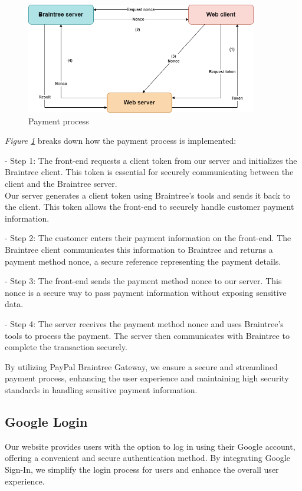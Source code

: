 \begin{figure}[H]
    \centering
    \includegraphics[width=0.9\textwidth]{Figures/payment-strat.png}
    \caption{Payment process}
    \label{fig:payment-flow}
\end{figure}

\emph{Figure \ref{fig:payment-flow}} breaks down how the payment process is implemented:

- Step 1:
The front-end requests a client token from our server and initializes the Braintree client. This token is essential for securely communicating between the client and the Braintree server.\\
Our server generates a client token using Braintree's tools and sends it back to the client. This token allows the front-end to securely handle customer payment information.

- Step 2:
The customer enters their payment information on the front-end. The Braintree client communicates this information to Braintree and returns a payment method nonce, a secure reference representing the payment details.

- Step 3:
The front-end sends the payment method nonce to our server. This nonce is a secure way to pass payment information without exposing sensitive data.

- Step 4:
The server receives the payment method nonce and uses Braintree's tools to process the payment. The server then communicates with Braintree to complete the transaction securely.

By utilizing PayPal Braintree Gateway, we ensure a secure and streamlined payment process, enhancing the user experience and maintaining high security standards in handling sensitive payment information.

\subsection{Google Login}
Our website provides users with the option to log in using their Google account,
offering a convenient and secure authentication method. By integrating Google Sign-In,
we simplify the login process for users and enhance the overall user experience.


